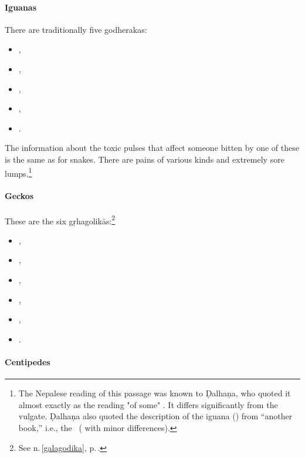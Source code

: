 \begin{translation}
\paragraph{Iguanas}

\item[28, verses 1, 2]
  \label{godheraka}
There are traditionally five \glspl{godheraka}:
\begin{itemize}
    \item {},
    \item {},
    \item {},
    \item {},
    \item {}.
\end{itemize}
The information about the toxic pulses that affect someone bitten by
one of these is the same as for snakes.  There are pains of various
kinds and extremely sore lumps.\footnote{The Nepalese reading of this
    passage was known to Ḍalhaṇa, who quoted it almost exactly as the
    reading "of some" \citep[587]{vulgate}. It differs significantly from
    the vulgate.  Ḍalhaṇa also quoted the description of the iguana
    () from  “another book,” i.e., the
    \CS\ ( with minor differences).}

\paragraph{Geckos}

\item[29 verses 1, 2]

These are the six \glspl{gṛhagolikā}:\footnote{See n.\,\ref{galagodika}, 
    p.\,\pageref{galagodika}.}
\begin{itemize}
    \item {},
    \item {},
    \item {},
    \item {},
    \item {},
    \item {}.
\end{itemize}


\paragraph{Centipedes}


\end{translation}
